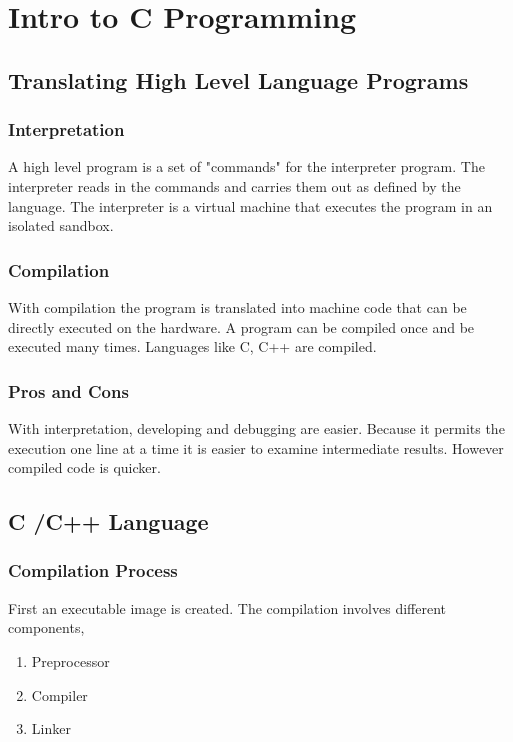 \setcounter{chapter}{10}
\chapter{Intro to C Programming}


\section{Translating High Level Language Programs}
\subsection{Interpretation}


A high level program is a set of "commands" for the interpreter program. The interpreter reads in the commands and carries them out as defined by the language. The interpreter is a virtual machine that executes the program in an isolated sandbox.

\subsection{Compilation}
With compilation the program is translated into machine code that can be directly executed on the hardware. A program can be compiled once and be executed many times. Languages like C, C++ are compiled.

\subsection{Pros and Cons}
With interpretation, developing and debugging are easier. Because it permits the execution one line at a time it is easier to examine intermediate results. However compiled code is quicker.


\section{C /C++ Language}
\subsection{Compilation Process}
First an executable image is created. The compilation involves different components, 
\begin{enumerate}
    \item Preprocessor
    \item Compiler
    \item Linker
\end{enumerate}

